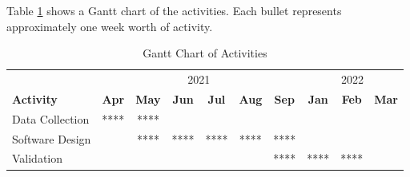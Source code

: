 Table \ref{tab:timetableactivities} shows a Gantt chart of the activities.  Each bullet represents approximately one week worth of activity.

\begin{table}[htbp]
    \centering
    \small
    \setlength{\tabcolsep}{4pt}
    \begin{tabular}{l|c|c|c|c|c|c|c|c|c}
         \toprule
         & \multicolumn{6}{c|}{2021} & \multicolumn{3}{c}{2022} \\
         \textbf{Activity} & \textbf{Apr} & \textbf{May} & \textbf{Jun} & \textbf{Jul} & \textbf{Aug} & \textbf{Sep} & \textbf{Jan} & \textbf{Feb} & \textbf{Mar} \\
         \midrule
         Data Collection & **** & **** & & & & & & & \\
         \midrule
         Software Design & & **** & **** & **** & **** & **** & & & \\
         \midrule
         Validation & & & & & & **** & **** & **** & \\
         \bottomrule
    \end{tabular}
    \caption{Gantt Chart of Activities}
    \label{tab:timetableactivities}
\end{table}
